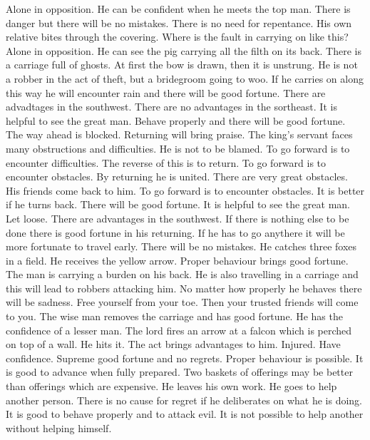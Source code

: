 	{Alone in opposition. He can be confident when he meets the top man. There is danger but there will be no
		mistakes.}
	{There is no need for repentance. His own relative bites through the covering. Where is the fault in
		carrying on like this?}
	{Alone in opposition. He can see the pig carrying all the filth on its back. There is a carriage full of
		ghosts. At first the bow is drawn, then it is unstrung. He is not a robber in the act of theft,
		but a bridegroom going to woo. If he carries on along this way he will encounter rain and there
		will be good fortune.}
\or {}
	{There are advadtages in the southwest. There are no advantages in the sortheast. It is helpful to see the
		great man. Behave properly and there will be good fortune.}
	{The way ahead is blocked. Returning will bring praise.}
	{The king's servant faces many obstructions and difficulties. He is not to be blamed.}
	{To go forward is to encounter difficulties. The reverse of this is to return.}
	{To go forward is to encounter obstacles. By returning he is united.}
	{There are very great obstacles. His friends come back to him.}
	{To go forward is to encounter obstacles. It is better if he turns back. There will be good fortune.
		It is helpful to see the great man.}
\or {}
	{Let loose. There are advantages in the southwest. If there is nothing else to be done there is good fortune in
		his returning. If he has to go anythere it will be more fortunate to travel early.}
	{There will be no mistakes.}
	{He catches three foxes in a field. He receives the yellow arrow. Proper behaviour brings good fortune.}
	{The man is carrying a burden on his back. He is also travelling in a carriage and this will lead to robbers
		attacking him. No matter how properly he behaves there will be sadness.}
	{Free yourself from your toe. Then your trusted friends will come to you.}
	{The wise man removes the carriage and has good fortune. He has the confidence of a lesser man.}
	{The lord fires an arrow at a falcon which is perched on top of a wall. He hits it. The act brings
		advantages to him.}
\or {}
	{Injured. Have confidence. Supreme good fortune and no regrets. Proper behaviour is possible. It is good to
		advance when fully prepared. Two baskets of offerings may be better than offerings which are
		expensive.}
	{He leaves his own work. He goes to help another person. There is no cause for regret if he deliberates
		on what he is doing.}
	{It is good to behave properly and to attack evil. It is not possible to help another without helping himself.}
